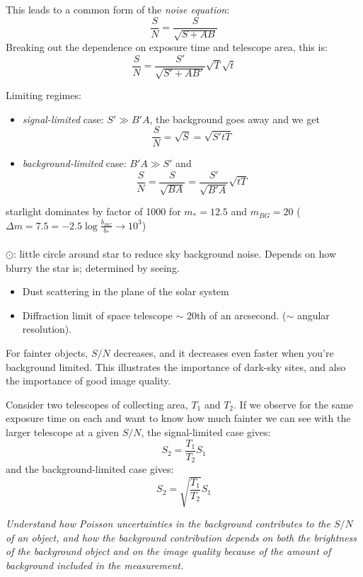 \documentclass[12pt]{article}
\newcommand{\mynotes}[1]{\textcolor{myBlue}{#1}}
\newcommand{\test}[1]{%
    \begin{center}
        {\parbox{0.9\textwidth}{\textit{\small#1}}}
    \end{center}}
\begin{document}
This leads to a common form of the \textit{noise equation}:
\[
    \frac{S}{N} = \frac{S}{\sqrt{S+AB}}  
    \]
Breaking out the dependence on exposure time and telescope area, this is:
\[
    \frac{S}{N} = \frac{S'}{\sqrt{S'+AB'}} \sqrt{T}\sqrt{t}
    \]

Limiting regimes:
\begin{itemize}
    \item \textit{signal-limited} case: $S'\gg B'A$,
        the background goes away and we get
        \[
             \frac{S}{N} = \sqrt{S} = \sqrt{S'tT} 
             \]
    \item \textit{background-limited} case: $B'A \gg S'$ and
        \[
            \frac{S}{N} = \frac{S}{\sqrt{BA}} = \frac{S'}{\sqrt{B'A}}\sqrt{tT}
            \]
\end{itemize}

\mynotes{starlight dominates by factor of 1000 for
$m_{*} = 12.5$ and $m_{BG} = 20$ ($\Delta{m} = 7.5
= -2.5\log\frac{b_{BG}}{b_*}
\rightarrow 10^{3}$)\\\\
\large$\odot$: \normalsize little circle around star to reduce sky
background noise. Depends on how blurry the star is; determined by
seeing.
\begin{itemize}
    \item Dust scattering in the plane of the solar system
    \item Diffraction limit of space telescope $\sim$ 20th of an
    arcsecond. ($\sim$ angular resolution).
\end{itemize}
}

For fainter objects, $S/N$ decreases, and it decreases even faster when you're
background limited. This illustrates the importance of dark-sky sites, and also
the importance of good image quality.

Consider two telescopes of collecting area, $T_{1}$ and $T_{2}$.
If we observe for the same exposure time on each and want to know how
much fainter we can see with the larger telescope at a given $S/N$,
the signal-limited case gives:
\[
    S_{2} = \frac{T_{1}}{T_{2}}S_{1} 
    \]
and the background-limited case gives:
\[
    S_{2} = \sqrt{\frac{T_{1}}{T_{2}}}S_{1}  
    \]

\test{Understand how Poisson uncertainties in the background contributes to the
$S/N$ of an object, and how the background contribution depends on both the
brightness of the background object and on the image quality because of the
amount of background included in the measurement.}
\end{document}
